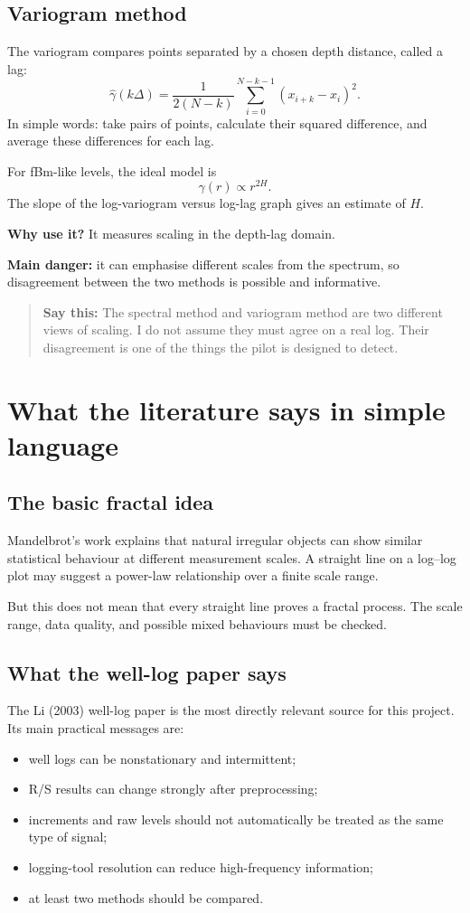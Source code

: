 \documentclass[11pt,a4paper]{article}
\newcommand{\term}[1]{\textbf{\color{Navy}#1}}
\newcommand{\say}[1]{\begin{quote}\color{Navy}\textbf{Say this:} #1\end{quote}}
\begin{document}
\subsection{Variogram method}
The variogram compares points separated by a chosen depth distance, called a lag:
\[
\widehat{\gamma}(k\Delta)=\frac{1}{2(N-k)}\sum_{i=0}^{N-k-1}(x_{i+k}-x_i)^2.
\]
In simple words: take pairs of points, calculate their squared difference, and average these differences for each lag.

For fBm-like levels, the ideal model is
\[
\gamma(r)\propto r^{2H}.
\]
The slope of the log-variogram versus log-lag graph gives an estimate of $H$.

\term{Why use it?} It measures scaling in the depth-lag domain.

\term{Main danger:} it can emphasise different scales from the spectrum, so disagreement between the two methods is possible and informative.

\say{The spectral method and variogram method are two different views of scaling. I do not assume they must agree on a real log. Their disagreement is one of the things the pilot is designed to detect.}

\section{What the literature says in simple language}
\subsection{The basic fractal idea}
Mandelbrot's work explains that natural irregular objects can show similar statistical behaviour at different measurement scales. A straight line on a log--log plot may suggest a power-law relationship over a finite scale range.

But this does not mean that every straight line proves a fractal process. The scale range, data quality, and possible mixed behaviours must be checked.

\subsection{What the well-log paper says}
The Li (2003) well-log paper is the most directly relevant source for this project. Its main practical messages are:
\begin{itemize}
\item well logs can be nonstationary and intermittent;
\item R/S results can change strongly after preprocessing;
\item increments and raw levels should not automatically be treated as the same type of signal;
\item logging-tool resolution can reduce high-frequency information;
\item at least two methods should be compared.
\end{itemize}
\end{document}
